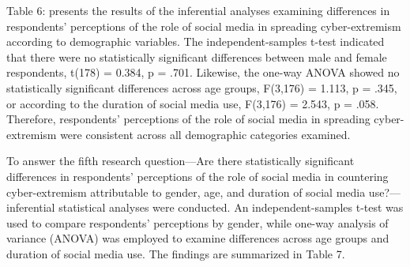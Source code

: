 \documentclass[10pt]{NSP1}
\begin{document}
Table 6: presents the results of the inferential analyses examining differences in respondents' perceptions of the role of social media in spreading cyber-extremism according to demographic variables. The independent-samples t-test indicated that there were no statistically significant differences between male and female respondents, t(178) = 0.384, p = .701. Likewise, the one-way ANOVA showed no statistically significant differences across age groups, F(3,176) = 1.113, p = .345, or according to the duration of social media use, F(3,176) = 2.543, p = .058. Therefore, respondents' perceptions of the role of social media in spreading cyber-extremism were consistent across all demographic categories examined.

\par\medskip{}\smallskip

To answer the fifth research question—Are there statistically significant differences in respondents' perceptions of the role of social media in countering cyber-extremism attributable to gender, age, and duration of social media use?—inferential statistical analyses were conducted. An independent-samples t-test was used to compare respondents' perceptions by gender, while one-way analysis of variance (ANOVA) was employed to examine differences across age groups and duration of social media use. The findings are summarized in Table 7.
\end{document}
